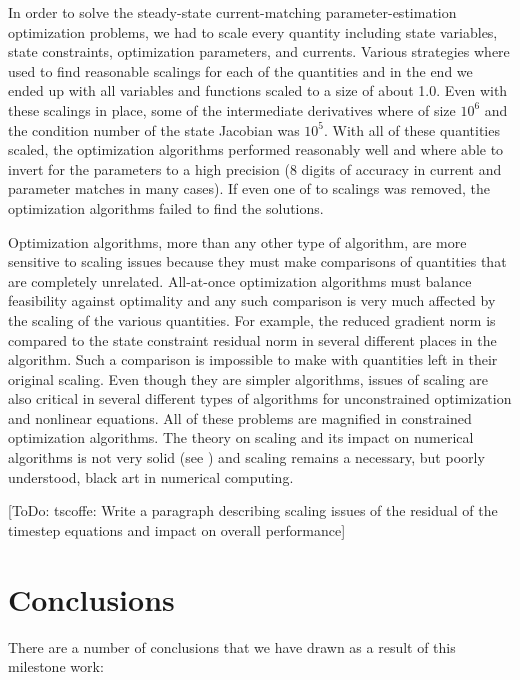 \documentclass[pdf,ps2pdf,11pt]{SANDreport}
\begin{document}
{In order to solve the steady-state current-matching parameter-estimation
optimization problems, we had to scale every quantity including state
variables, state constraints, optimization parameters, and currents.  Various
strategies where used to find reasonable scalings for each of the quantities
and in the end we ended up with all variables and functions scaled to a size
of about 1.0.  Even with these scalings in place, some of the intermediate
derivatives where of size $10^{6}$ and the condition number of the state
Jacobian was $10^{5}$.  With all of these quantities scaled, the optimization
algorithms performed reasonably well and where able to invert for the
parameters to a high precision (8 digits of accuracy in current and parameter
matches in many cases).  If even one of to scalings was removed, the
optimization algorithms failed to find the solutions.

Optimization algorithms, more than any other type of algorithm, are more
sensitive to scaling issues because they must make comparisons of quantities
that are completely unrelated.  All-at-once optimization algorithms must
balance feasibility against optimality and any such comparison is very much
affected by the scaling of the various quantities.  For example, the reduced
gradient norm is compared to the state constraint residual norm in several
different places in the algorithm.  Such a comparison is impossible to make
with quantities left in their original scaling.  Even though they are simpler
algorithms, issues of scaling are also critical in several different types of
algorithms for unconstrained optimization and nonlinear equations.  All of
these problems are magnified in constrained optimization algorithms.  The
theory on scaling and its impact on numerical algorithms is not very solid
(see {}\cite{ref:dennis_schnabel_1996}) and scaling remains a necessary, but
poorly understood, black art in numerical computing.

[ToDo: tscoffe: Write a paragraph describing scaling issues of the residual of
the timestep equations and impact on overall performance]


%
\section{Conclusions}
%

There are a number of conclusions that we have drawn as a result of this
milestone work:

\begin{itemize}


\end{itemize}}
\end{document}
